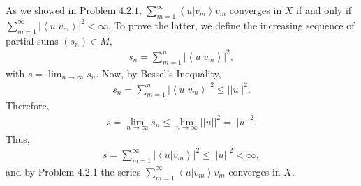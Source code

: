 \begin{questions}

\begin{solution}
As we showed in Problem $4.2.1$, $\sum_{m=1}^{\infty}\left<u|v_m\right>v_m$ converges in $X$ if and only if \newline $\sum_{m=1}^{\infty}\left|\left<u|v_m\right>\right|^2<\infty$. To prove the latter, we define the increasing sequence of partial sums $(s_n)\in M$,
\begin{align*}
s_n=\sum_{m=1}^n\left|\left<u|v_m\right>\right|^2,
\end{align*}
with $s=\lim_{n\rightarrow\infty} s_n$. Now, by Bessel's Inequality,
\begin{align*}
s_n=\sum_{m=1}^n\left|\left<u|v_m\right>\right|^2\leq||u||^2.
\end{align*}
Therefore,
\begin{align*}
s=\lim_{n\rightarrow\infty} s_n\leq\lim_{n\rightarrow\infty} ||u||^2=||u||^2.
\end{align*}
Thus,
\begin{align*}
s=\sum_{m=1}^{\infty}\left|\left<u|v_m\right>\right|^2\leq ||u||^2<\infty,
\end{align*}
and by Problem 4.2.1 the series $\sum_{m=1}^\infty \left\langle u|v_m \right\rangle v_m$ converges in $X$.
\end{solution}
\end{questions}